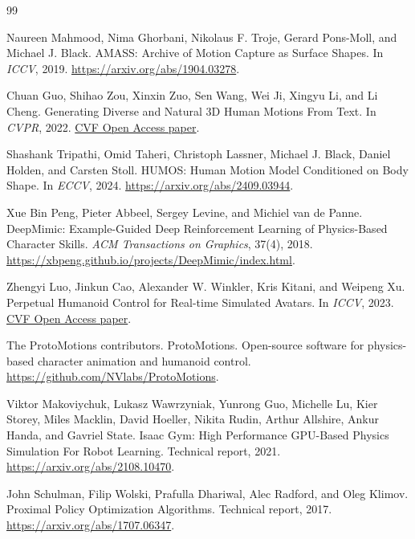 \begin{thebibliography}{99}

Naureen Mahmood, Nima Ghorbani, Nikolaus F. Troje, Gerard Pons-Moll,
and Michael J. Black.
AMASS: Archive of Motion Capture as Surface Shapes.
In \emph{ICCV}, 2019.
\url{https://arxiv.org/abs/1904.03278}.

Chuan Guo, Shihao Zou, Xinxin Zuo, Sen Wang, Wei Ji, Xingyu Li,
and Li Cheng.
Generating Diverse and Natural 3D Human Motions From Text.
In \emph{CVPR}, 2022.
\href{https://openaccess.thecvf.com/content/CVPR2022/html/Guo_Generating_Diverse_and_Natural_3D_Human_Motions_From_Text_CVPR_2022_paper.html}
{CVF Open Access paper}.

Shashank Tripathi, Omid Taheri, Christoph Lassner, Michael J. Black,
Daniel Holden, and Carsten Stoll.
HUMOS: Human Motion Model Conditioned on Body Shape.
In \emph{ECCV}, 2024.
\url{https://arxiv.org/abs/2409.03944}.

Xue Bin Peng, Pieter Abbeel, Sergey Levine, and Michiel van de Panne.
DeepMimic: Example-Guided Deep Reinforcement Learning of Physics-Based
Character Skills.
\emph{ACM Transactions on Graphics}, 37(4), 2018.
\url{https://xbpeng.github.io/projects/DeepMimic/index.html}.

Zhengyi Luo, Jinkun Cao, Alexander W. Winkler, Kris Kitani, and Weipeng Xu.
Perpetual Humanoid Control for Real-time Simulated Avatars.
In \emph{ICCV}, 2023.
\href{https://openaccess.thecvf.com/content/ICCV2023/html/Luo_Perpetual_Humanoid_Control_for_Real-time_Simulated_Avatars_ICCV_2023_paper.html}
{CVF Open Access paper}.

The ProtoMotions contributors.
ProtoMotions.
Open-source software for physics-based character animation and humanoid control.
\url{https://github.com/NVlabs/ProtoMotions}.

Viktor Makoviychuk, Lukasz Wawrzyniak, Yunrong Guo, Michelle Lu, Kier Storey,
Miles Macklin, David Hoeller, Nikita Rudin, Arthur Allshire, Ankur Handa,
and Gavriel State.
Isaac Gym: High Performance GPU-Based Physics Simulation For Robot Learning.
Technical report, 2021.
\url{https://arxiv.org/abs/2108.10470}.

John Schulman, Filip Wolski, Prafulla Dhariwal, Alec Radford, and Oleg Klimov.
Proximal Policy Optimization Algorithms.
Technical report, 2017.
\url{https://arxiv.org/abs/1707.06347}.


\end{thebibliography}
